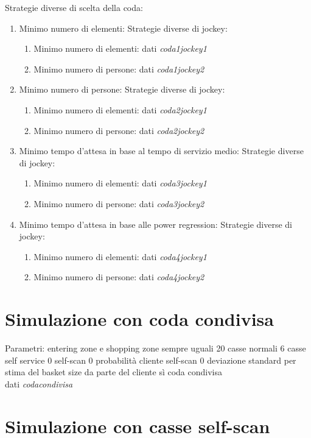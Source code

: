 Strategie diverse di scelta della coda:
\begin{enumerate}
	\item Minimo numero di elementi:
	Strategie diverse di jockey:
	\begin{enumerate}
		\item Minimo numero di elementi: dati \textit{coda1jockey1}
		\item Minimo numero di persone: dati \textit{coda1jockey2}
	\end{enumerate}
	\item Minimo numero di persone:
	Strategie diverse di jockey:
	\begin{enumerate}
		\item Minimo numero di elementi: dati \textit{coda2jockey1}
		\item Minimo numero di persone: dati \textit{coda2jockey2}
	\end{enumerate}
	\item Minimo tempo d'attesa in base al tempo di servizio medio:
	Strategie diverse di jockey:
	\begin{enumerate}
		\item Minimo numero di elementi: dati \textit{coda3jockey1}
		\item Minimo numero di persone: dati \textit{coda3jockey2}
	\end{enumerate}
	\item Minimo tempo d'attesa in base alle power regression: Strategie diverse di jockey:
	\begin{enumerate}
		\item Minimo numero di elementi: dati \textit{coda4jockey1}
		\item Minimo numero di persone: dati \textit{coda4jockey2}
	\end{enumerate}
\end{enumerate}

\section{Simulazione con coda condivisa}

Parametri:
entering zone e shopping zone sempre uguali
20 casse normali
6 casse self service
0 self-scan
0 probabilità cliente self-scan
0 deviazione standard per stima del basket size da parte del cliente
sì coda condivisa
\\
dati \textit{codacondivisa}

\section{Simulazione con casse self-scan}

